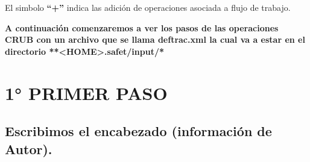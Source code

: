 \documentclass[letterpaper,11pt,spanish]{sphinxmanual}
\begin{document}
El simbolo \textbf{``+''} indica las adición de operaciones asociada a flujo de trabajo.

\textbf{A continuación comenzaremos a ver los pasos de las operaciones CRUB con un archivo que se llama deftrac.xml la cual va a estar en el directorio **\textless{}HOME\textgreater{}.safet/input/*}


\section{1° PRIMER PASO}
\label{_templates/Contenido6/Parte2:primer-paso}

\subsection{Escribimos el encabezado (información de Autor).}
\end{document}
